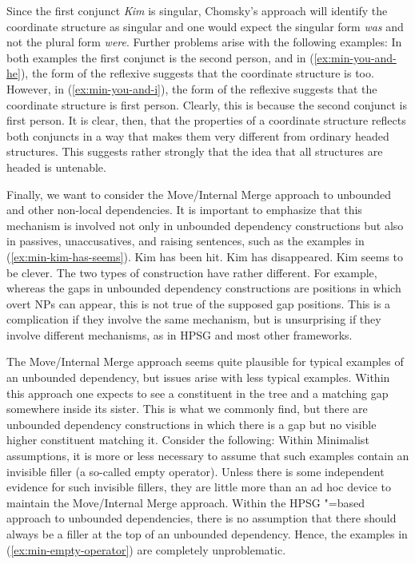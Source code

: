 \documentclass[output=paper]{langsci/langscibook}
\begin{document}
\label{ex:min-kim-lee-late}
\z
Since the first conjunct \textit{Kim} is singular, Chomsky's approach will identify the coordinate structure as singular and one would expect the singular form \textit{was} and not the plural form \textit{were}. Further problems arise with the following examples:
\eal
{}\label{ex:min-you-and-he}
\label{ex:min-you-and-i}
\zl 
In both examples the first conjunct is the second person, and in (\ref{ex:min-you-and-he}), the form of the reflexive suggests that the coordinate structure is too. However, in (\ref{ex:min-you-and-i}), the form of the reflexive suggests that the coordinate structure is first person. Clearly, this is because the second conjunct is first person. It is clear, then, that the properties of a coordinate structure reflects both conjuncts in a way that makes them very different from ordinary headed structures. This suggests rather strongly that the idea that all structures are headed is untenable.

Finally, we want to consider the Move/Internal Merge approach to unbounded and other non-local dependencies. It is important to emphasize that this mechanism is involved not only in unbounded dependency constructions but also in passives, unaccusatives, and raising sentences, such as the examples in (\ref{ex:min-kim-has-seems}).
\eal\label{ex:min-kim-has-seems}
\ex Kim has been hit.
\ex Kim has disappeared.
\ex Kim seems to be clever.
\zl
The two types of construction have rather different. For example, whereas the gaps in unbounded dependency constructions are positions in which overt NPs can appear, this is not true of the supposed gap positions.
\eal
{}
\zl 
This is a complication if they involve the same mechanism, but is unsurprising if they involve different mechanisms, as in HPSG and most other frameworks.

The Move/Internal Merge approach seems quite plausible for typical examples of an unbounded dependency, but issues arise with less typical examples. Within this approach one expects to see a constituent in the tree and a matching gap somewhere inside its sister. This is what we commonly find, but there are unbounded dependency constructions in which there is a gap but no visible higher constituent matching it. Consider \eg the following:
\eal\label{ex:min-empty-operator}
\zl 
Within Minimalist assumptions, it is more or less necessary to assume that such examples contain an invisible filler (a so-called empty operator). Unless there is some independent evidence for such invisible fillers, they are little more than an ad hoc device to maintain the Move/Internal Merge approach. Within the HPSG \slasch"=based approach to unbounded dependencies, there is no assumption that there should always be a filler at the top of an unbounded dependency. Hence, the examples in (\ref{ex:min-empty-operator}) are completely unproblematic.
\end{document}
